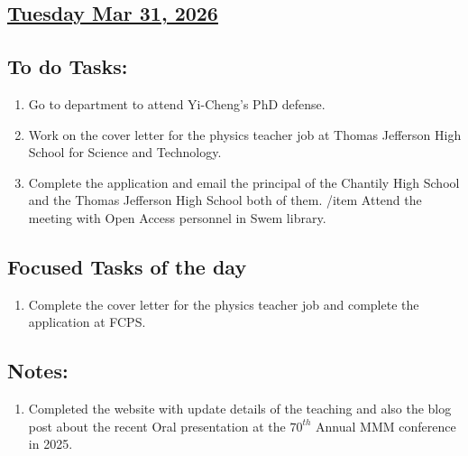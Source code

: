 \subsection*{\underline{Tuesday Mar 31, 2026}}
\subsection*{To do Tasks:}
\begin{enumerate}
    \item Go to department to attend Yi-Cheng's PhD defense. \cmark
    \item Work on the cover letter for the physics teacher job at Thomas Jefferson High School for Science and Technology.
    \item Complete the application and email the principal of the Chantily High School and the Thomas Jefferson High School both of them. 
	/item Attend the meeting with Open Access personnel in Swem library. \cmark
\end{enumerate}
\subsection*{Focused Tasks of the day}
\begin{enumerate}[\ding{212}]  
    \item Complete the cover letter for the physics teacher job and complete the application at FCPS. \cmark
\end{enumerate}
\subsection*{Notes:}
\begin{enumerate}
    \item Completed the website with update details of the teaching and also the blog post about the recent Oral presentation at the $70^{th}$ Annual MMM conference in 2025. 
\end{enumerate}
\stardivider
